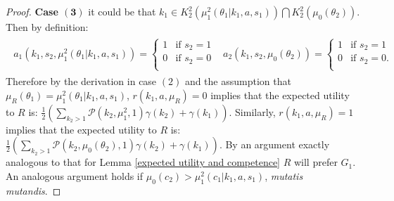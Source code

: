 \documentclass[11pt,]{article}
\begin{document}
\begin{proof}
\noindent\textbf{Case $\mathbf{(3)}$} it could be that $k_1\in K^2_2(\mu_1^2(\theta_1|k_1,a,s_1))\bigcap K^2_2(\mu_0(\theta_2))$.  Then by definition:
\begin{align*}
\begin{array}{cc}
a_1(k_1,s_2,\mu_1^2(\theta_1|k_1,a,s_1))=\left\{\begin{array}{ll}
1&\mbox{if }s_2=1\\
0&\mbox{if }s_2=0\\
\end{array}\right.&
a_2(k_1,s_2,\mu_0(\theta_2))=\left\{\begin{array}{ll}
1&\mbox{if }s_2=1\\
0&\mbox{if }s_2=0.\\
\end{array}\right.
\end{array}
\end{align*}Therefore by the derivation in case $(2)$ and the assumption that $\mu_R(\theta_1)=\mu_1^2(\theta_1|k_1,a,s_1)$, $r(k_1,a,\mu_R)=0$ implies that the expected utility to $R$ is: $\frac{1}{2}\left(\sum_{k_2>1}\mathcal{P}(k_2,\mu_1^2,1)\gamma(k_2)+\gamma(k_1)\right)$.  Similarly, $r(k_1,a,\mu_R)=1$ implies that the expected utility to $R$ is: $\frac{1}{2}\left(\sum_{k_2>1}\mathcal{P}(k_2,\mu_0(\theta_2),1)\gamma(k_2)+\gamma(k_1)\right)$.  By an argument exactly analogous to that for Lemma \ref{expected utility and competence} $R$ will prefer $G_1$.  An analogous argument holds if $\mu_0(c_2)>\mu_1^2(c_1|k_1,a,s_1)$, \textit{mutatis mutandis}.  


\end{proof}
\end{document}
